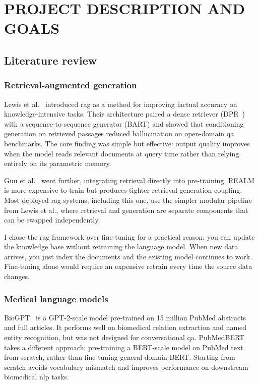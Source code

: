 \chapter{\MakeUppercase{Project Description and Goals}}

\section{Literature review}

\subsection{Retrieval-augmented generation}

Lewis et al.~\cite{lewis2020rag} introduced \ac{rag} as a method for improving factual accuracy on knowledge-intensive tasks. Their architecture paired a dense retriever (DPR~\cite{karpukhin2020dpr}) with a sequence-to-sequence generator (BART) and showed that conditioning generation on retrieved passages reduced hallucination on open-domain \ac{qa} benchmarks. The core finding was simple but effective: output quality improves when the model reads relevant documents at query time rather than relying entirely on its parametric memory.

Guu et al.~\cite{guu2020realm} went further, integrating retrieval directly into pre-training. REALM is more expensive to train but produces tighter retrieval-generation coupling. Most deployed \ac{rag} systems, including this one, use the simpler modular pipeline from Lewis et al., where retrieval and generation are separate components that can be swapped independently.

I chose the \ac{rag} framework over fine-tuning for a practical reason: you can update the knowledge base without retraining the language model. When new data arrives, you just index the documents and the existing model continues to work. Fine-tuning alone would require an expensive retrain every time the source data changes.

\subsection{Medical language models}

BioGPT~\cite{luo2022biogpt} is a GPT-2-scale model pre-trained on 15 million PubMed abstracts and full articles. It performs well on biomedical relation extraction and named entity recognition, but was not designed for conversational \ac{qa}. PubMedBERT~\cite{gu2021pubmedbert} takes a different approach: pre-training a BERT-scale model on PubMed text from scratch, rather than fine-tuning general-domain BERT. Starting from scratch avoids vocabulary mismatch and improves performance on downstream biomedical \ac{nlp} tasks.

